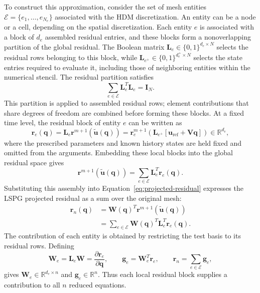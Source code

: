 \documentclass[a4paper,12pt]{article}
\newcommand{\vect}[1]{\boldsymbol{#1}}
\newcommand{\matr}[1]{\boldsymbol{#1}}
\begin{document}
To construct this approximation, consider the set of mesh entities $\mathcal E=\{e_1,\ldots,e_{N_e}\}$ associated with the HDM discretization. An entity can be a node or a cell, depending on the spatial discretization. Each entity $e$ is associated with a block of $d_e$ assembled residual entries, and these blocks form a nonoverlapping partition of the global residual. The Boolean matrix $\matr{L}_e\in\{0,1\}^{d_e\times N}$ selects the residual rows belonging to this block, while $\matr{L}_{e^+}\in\{0,1\}^{d_e^+\times N}$ selects the state entries required to evaluate it, including those of neighboring entities within the numerical stencil. The residual partition satisfies
\begin{equation}
 \sum_{e\in\mathcal E}\matr{L}_e^T\matr{L}_e=\matr{I}_N.
 \label{eq:residual-partition}
\end{equation}
This partition is applied to assembled residual rows; element contributions that share degrees of freedom are combined before forming these blocks. At a fixed time level, the residual block of entity $e$ can be written as
\begin{equation}
 \vect{r}_e(\vect{q})
 =\matr{L}_e\vect{r}^{m+1}(\widetilde{\vect{u}}(\vect{q}))
 =\vect{r}_e^{m+1}\!\left(
    \matr{L}_{e^+}[\vect{u}_{\mathrm{ref}}+\matr{V}\vect{q}]\right)
 \in\mathbb R^{d_e},
 \label{eq:entity-blocks}
\end{equation}
where the prescribed parameters and known history states are held fixed and omitted from the arguments. Embedding these local blocks into the global residual space gives
\begin{equation}
 \vect{r}^{m+1}(\widetilde{\vect{u}}(\vect{q}))
 =\sum_{e\in\mathcal E}\matr{L}_e^T\vect{r}_e(\vect{q}).
 \label{eq:residual-assembly}
\end{equation}
Substituting this assembly into Equation~\eqref{eq:projected-residual} expresses the LSPG projected residual as a sum over the original mesh:
\begin{equation}
 \begin{aligned}
 \vect{r}_n(\vect{q})
 &=\matr{W}(\vect{q})^T
       \vect{r}^{m+1}(\widetilde{\vect{u}}(\vect{q}))\\
 &=\sum_{e\in\mathcal E}
       \matr{W}(\vect{q})^T\matr{L}_e^T\vect{r}_e(\vect{q}).
 \end{aligned}
 \label{eq:full-projected-sum}
\end{equation}
The contribution of each entity is obtained by restricting the test basis to its residual rows. Defining
\begin{equation}
 \matr{W}_e=\matr{L}_e\matr{W}
           =\frac{\partial\vect{r}_e}{\partial\vect{q}},
 \qquad
 \vect{g}_e=\matr{W}_e^T\vect{r}_e,
 \qquad
 \vect{r}_n=\sum_{e\in\mathcal E}\vect{g}_e,
 \label{eq:entity-contribution}
\end{equation}
gives $\matr{W}_e\in\mathbb R^{d_e\times n}$ and $\vect{g}_e\in\mathbb R^n$. Thus each local residual block supplies a contribution to all $n$ reduced equations.
\end{document}
